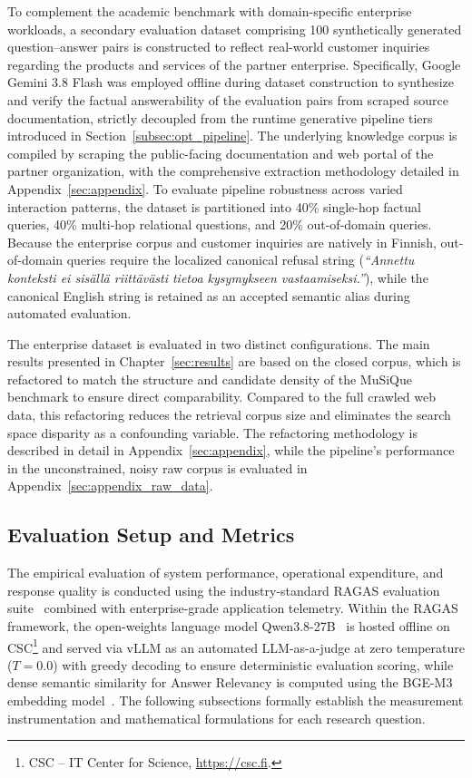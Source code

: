 To complement the academic benchmark with domain-specific enterprise workloads, a secondary evaluation dataset comprising 100 synthetically generated question--answer pairs is constructed to reflect real-world customer inquiries regarding the products and services of the partner enterprise. Specifically, Google Gemini 3.8 Flash was employed offline during dataset construction to synthesize and verify the factual answerability of the evaluation pairs from scraped source documentation, strictly decoupled from the runtime generative pipeline tiers introduced in Section~\ref{subsec:opt_pipeline}. The underlying knowledge corpus is compiled by scraping the public-facing documentation and web portal of the partner organization, with the comprehensive extraction methodology detailed in Appendix~\ref{sec:appendix}. To evaluate pipeline robustness across varied interaction patterns, the dataset is partitioned into 40\% single-hop factual queries, 40\% multi-hop relational questions, and 20\% out-of-domain queries. Because the enterprise corpus and customer inquiries are natively in Finnish, out-of-domain queries require the localized canonical refusal string (\textit{``Annettu konteksti ei sisällä riittävästi tietoa kysymykseen vastaamiseksi.''}), while the canonical English string is retained as an accepted semantic alias during automated evaluation.

The enterprise dataset is evaluated in two distinct configurations. The main results presented in Chapter~\ref{sec:results} are based on the closed corpus, which is refactored to match the structure and candidate density of the MuSiQue~\citep{trivedi2022musique} benchmark to ensure direct comparability. Compared to the full crawled web data, this refactoring reduces the retrieval corpus size and eliminates the search space disparity as a confounding variable. The refactoring methodology is described in detail in Appendix~\ref{sec:appendix}, while the pipeline's performance in the unconstrained, noisy raw corpus is evaluated in Appendix~\ref{sec:appendix_raw_data}.

\subsection{Evaluation Setup and Metrics}
\label{subsec:eval_metrics}

The empirical evaluation of system performance, operational expenditure, and response quality is conducted using the industry-standard RAGAS evaluation suite~\citep{es2024ragas} combined with enterprise-grade application telemetry. Within the RAGAS framework, the open-weights language model Qwen3.8-27B~\citep{yang2025qwen3} is hosted offline on CSC\footnote{CSC -- IT Center for Science, \url{https://csc.fi}.} and served via vLLM as an automated LLM-as-a-judge at zero temperature ($T=0.0$) with greedy decoding to ensure deterministic evaluation scoring, while dense semantic similarity for Answer Relevancy is computed using the BGE-M3 embedding model~\citep{chen2024bge}. The following subsections formally establish the measurement instrumentation and mathematical formulations for each research question.

